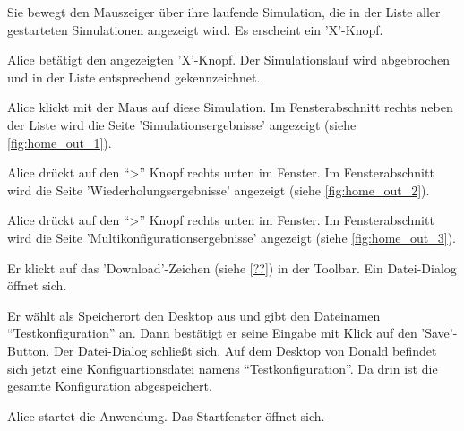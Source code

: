 \documentclass[parskip=full,11pt]{scrartcl}
\begin{document}
{Sie bewegt den Mauszeiger über ihre laufende Simulation, die in der Liste aller gestarteten Simulationen angezeigt wird.}
{Es erscheint ein 'X'-Knopf.}

{Alice betätigt den angezeigten 'X'-Knopf.}
{Der Simulationslauf wird abgebrochen und in der Liste entsprechend gekennzeichnet.}

{Alice klickt mit der Maus auf diese Simulation.}
{Im Fensterabschnitt rechts neben der Liste wird die Seite 'Simulationsergebnisse' angezeigt (siehe \cref{fig:home_out_1}).}

{Alice drückt auf den \enquote{>} Knopf rechts unten im Fenster.}
{Im Fensterabschnitt wird die Seite 'Wiederholungsergebnisse' angezeigt (siehe \cref{fig:home_out_2}).}

{Alice drückt auf den \enquote{>} Knopf rechts unten im Fenster.}
{Im Fensterabschnitt wird die Seite 'Multikonfigurationsergebnisse' angezeigt (siehe \cref{fig:home_out_3}).}


{Er klickt auf das 'Download'-Zeichen (siehe \cref{??}) in der Toolbar.}
{Ein Datei-Dialog öffnet sich.}

{Er wählt als Speicherort den Desktop aus und gibt den Dateinamen \enquote{Testkonfiguration} an. Dann bestätigt er seine Eingabe mit Klick auf den 'Save'-Button.}
{Der Datei-Dialog schließt sich. Auf dem Desktop von Donald befindet sich jetzt eine Konfiguartionsdatei namens \enquote{Testkonfiguration}. Da drin ist die gesamte Konfiguration abgespeichert.}

{Alice startet die Anwendung.}
{Das Startfenster öffnet sich.}
\end{document}
